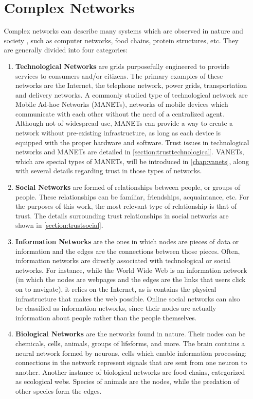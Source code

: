 \chapter{Complex Networks}
\label{chap:complexnetworks}

Complex networks can describe many systems which are observed in nature and society \cite{newmannetworks}, such as computer networks, food chains, protein structures, etc. 
They are generally divided into four categories:

\begin{enumerate}
	\item \textbf{Technological Networks} are grids purposefully engineered to provide services to consumers and/or citizens.
	 	The primary examples of these networks are the Internet, the telephone network, power grids, transportation and delivery networks.
	 	A commonly studied type of technological network are Mobile Ad-hoc Networks (MANETs), networks of mobile devices which communicate with each other without the need of a centralized agent.
		Although not of widespread use, MANETs can provide a way to create a network without pre-existing infrastructure, as long as each device is equipped with the proper hardware and software.
		Trust issues in technological networks and MANETs are detailed in \autoref{section:trusttechnological}.
		VANETs, which are special types of MANETs, will be introduced in \autoref{chap:vanets}, along with several details regarding trust in those types of networks.
	\item \textbf{Social Networks} are formed of relationships between people, or groups of people.
		These relationships can be familiar, friendships, acquaintance, etc.
		For the purposes of this work, the most relevant type of relationship is that of trust.
		The details surrounding trust relationships in social networks are shown in \autoref{section:trustsocial}.
	\item \textbf{Information Networks} are the ones in which nodes are pieces of data or information and the edges are the connections between those pieces.
		Often, information networks are directly associated with technological or social networks.
		For instance, while the World Wide Web is an information network (in which the nodes are webpages and the edges are the links that users click on to navigate), it relies on the Internet, as is contains the physical infrastructure that makes the web possible.
		Online social networks can also be classified as information networks, since their nodes are actually information about people rather than the people themselves.
	\item \textbf{Biological Networks} are the networks found in nature.
		Their nodes can be chemicals, cells, animals, groups of lifeforms, and more.
		The brain contains a neural network formed by neurons, cells which enable information processing; connections in the network represent signals that are sent from one neuron to another.
		Another instance of biological networks are food chains, categorized as ecological webs.
		Species of animals are the nodes, while the predation of other species form the edges.
		
\end{enumerate}

